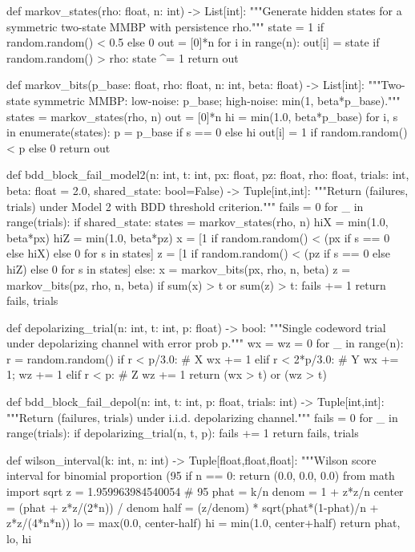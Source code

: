def markov_states(rho: float, n: int) -> List[int]:
    """Generate hidden states for a symmetric two-state MMBP with persistence rho."""
    state = 1 if random.random() < 0.5 else 0
    out = [0]*n
    for i in range(n):
        out[i] = state
        if random.random() > rho:
            state ^= 1
    return out

def markov_bits(p_base: float, rho: float, n: int, beta: float) -> List[int]:
    """Two-state symmetric MMBP: low-noise: p_base; high-noise: min(1, beta*p_base)."""
    states = markov_states(rho, n)
    out = [0]*n
    hi = min(1.0, beta*p_base)
    for i, s in enumerate(states):
        p = p_base if s == 0 else hi
        out[i] = 1 if random.random() < p else 0
    return out

def bdd_block_fail_model2(n: int, t: int, px: float, pz: float, rho: float, trials: int,
                          beta: float = 2.0,
                          shared_state: bool=False) -> Tuple[int,int]:
    """Return (failures, trials) under Model 2 with BDD threshold criterion."""
    fails = 0
    for _ in range(trials):
        if shared_state:
            states = markov_states(rho, n)
            hiX = min(1.0, beta*px)
            hiZ = min(1.0, beta*pz)
            x = [1 if random.random() < (px if s == 0 else hiX) else 0 for s in states]
            z = [1 if random.random() < (pz if s == 0 else hiZ) else 0 for s in states]
        else:
            x = markov_bits(px, rho, n, beta)
            z = markov_bits(pz, rho, n, beta)
        if sum(x) > t or sum(z) > t:
            fails += 1
    return fails, trials

def depolarizing_trial(n: int, t: int, p: float) -> bool:
    """Single codeword trial under depolarizing channel with error prob p."""
    wx = wz = 0
    for _ in range(n):
        r = random.random()
        if r < p/3.0:            # X
            wx += 1
        elif r < 2*p/3.0:        # Y
            wx += 1; wz += 1
        elif r < p:              # Z
            wz += 1
    return (wx > t) or (wz > t)

def bdd_block_fail_depol(n: int, t: int, p: float, trials: int) -> Tuple[int,int]:
    """Return (failures, trials) under i.i.d. depolarizing channel."""
    fails = 0
    for _ in range(trials):
        if depolarizing_trial(n, t, p):
            fails += 1
    return fails, trials

def wilson_interval(k: int, n: int) -> Tuple[float,float,float]:
    """Wilson score interval for binomial proportion (95%
    if n == 0:
        return (0.0, 0.0, 0.0)
    from math import sqrt
    z = 1.959963984540054 # 95%
    phat = k/n
    denom = 1 + z*z/n
    center = (phat + z*z/(2*n)) / denom
    half = (z/denom) * sqrt(phat*(1-phat)/n + z*z/(4*n*n))
    lo = max(0.0, center-half)
    hi = min(1.0, center+half)
    return phat, lo, hi

